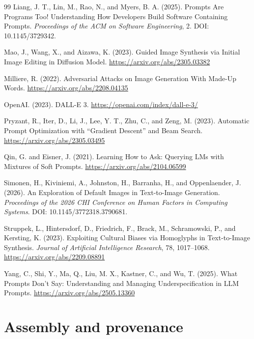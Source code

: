 \documentclass[11pt]{article}
\begin{document}
\begin{thebibliography}{99}
Liang, J. T., Lin, M., Rao, N., and Myers, B. A. (2025).
Prompts Are Programs Too! Understanding How Developers Build Software Containing Prompts.
\emph{Proceedings of the ACM on Software Engineering}, 2.
DOI: 10.1145/3729342.

Mao, J., Wang, X., and Aizawa, K. (2023).
Guided Image Synthesis via Initial Image Editing in Diffusion Model.
\url{https://arxiv.org/abs/2305.03382}

Milliere, R. (2022).
Adversarial Attacks on Image Generation With Made-Up Words.
\url{https://arxiv.org/abs/2208.04135}

OpenAI. (2023).
DALL-E 3.
\url{https://openai.com/index/dall-e-3/}

Pryzant, R., Iter, D., Li, J., Lee, Y. T., Zhu, C., and Zeng, M. (2023).
Automatic Prompt Optimization with ``Gradient Descent'' and Beam Search.
\url{https://arxiv.org/abs/2305.03495}

Qin, G. and Eisner, J. (2021).
Learning How to Ask: Querying LMs with Mixtures of Soft Prompts.
\url{https://arxiv.org/abs/2104.06599}

Simonen, H., Kiviniemi, A., Johnston, H., Barranha, H., and Oppenlaender, J. (2026).
An Exploration of Default Images in Text-to-Image Generation.
\emph{Proceedings of the 2026 CHI Conference on Human Factors in Computing Systems}.
DOI: 10.1145/3772318.3790681.

Struppek, L., Hintersdorf, D., Friedrich, F., Brack, M., Schramowski, P., and Kersting, K. (2023).
Exploiting Cultural Biases via Homoglyphs in Text-to-Image Synthesis.
\emph{Journal of Artificial Intelligence Research}, 78, 1017--1068.
\url{https://arxiv.org/abs/2209.08891}

Yang, C., Shi, Y., Ma, Q., Liu, M. X., Kastner, C., and Wu, T. (2025).
What Prompts Don't Say: Understanding and Managing Underspecification in LLM Prompts.
\url{https://arxiv.org/abs/2505.13360}

\end{thebibliography}

\appendix
\section{Assembly and provenance}
\end{document}

